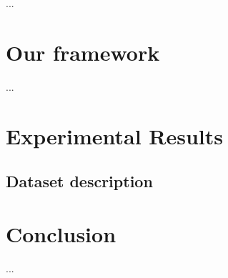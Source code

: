 \documentclass{esannV2}
\begin{document}
...

\section{Our framework}
...

\section{Experimental Results}
\subsection{Dataset description}

\section{Conclusion}
...


\begin{footnotesize}







\end{footnotesize}

\end{document}
